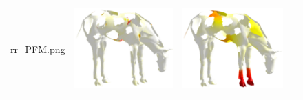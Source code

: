 \documentclass[10pt,twocolumn,letterpaper]{article}
\begin{document}
\begin{figure}[htb]
\begin{tabular}[width=0.8\textwidth]{cc|cc}
rr_PFM.png} &  \includegraphics[scale=0.5]{figures/holes_horse_16_err.png} &  \includegraphics[scale=0.5]{figures/holes_horse_16_err_PFM.png}\\

\end{tabular}
\end{figure}
\end{document}

